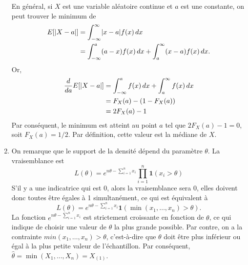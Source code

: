 \begin{solution}{4.8}
\begin{enumerate}
      En général, si $X$ est une variable aléatoire continue et $a$ est une constante, on peut trouver le minimum de
    \begin{align*}
      E [ \lvert X - a \rvert ]
      &= \int_{-\infty}^\infty \lvert x - a \rvert f(x)\,dx \\
      &= \int_{-\infty}^a (a - x)f(x)\, dx
      + \int_a^\infty (x - a)f(x)\,dx.
    \end{align*}
    Or,
    \begin{align*}
      \frac{d}{da} E [ \lvert X - a \rvert ]
      &= \int_{-\infty}^a f(x)\, dx + \int_a^\infty f(x)\, dx \\
      &= F_X(a) - (1 - F_X(a)) \\
      &= 2F_X(a) - 1
    \end{align*}
    Par conséquent, le minimum est atteint au point $a$ tel que
    $2F_X(a) - 1 = 0$, soit $F_X(a) = 1/2$. Par définition, cette
    valeur est la médiane de $X$.

    \item On remarque que le support de la densité dépend du paramètre
      $\theta$. La vraisemblance est
      \begin{equation*}
        L(\theta) = e^{n\theta - \sum_{i=1}^n x_i}\prod_{i=1}^n\mathbf{1}(x_i>\theta)
      \end{equation*}
      S'il y a une indicatrice qui est 0, alors la vraisemblance sera 0, elles doivent donc toutes être égales à 1 simultanément, ce qui est équivalent à
      \begin{equation*}
        L(\theta) = e^{n\theta - \sum_{i=1}^n x_i}\mathbf{1}(\min(x_1,\ldots,x_n)>\theta).
      \end{equation*}
      La fonction $e^{n\theta - \sum_{i=1}^n x_i}$ est strictement
      croissante en fonction de $\theta$, ce qui indique de choisir
      une valeur de $\theta$ la plus grande possible. Par contre, on a
      la contrainte $min(x_1,\ldots,x_n)>\theta$, c'est-à-dire que $\theta$ doit
      être plus inférieur ou égal à la plus petite valeur de
      l'échantillon. Par conséquent, $\hat{\theta} = \min(X_1, \dots,
      X_n) = X_{(1)}$.
    \end{enumerate}
  
\end{solution}
